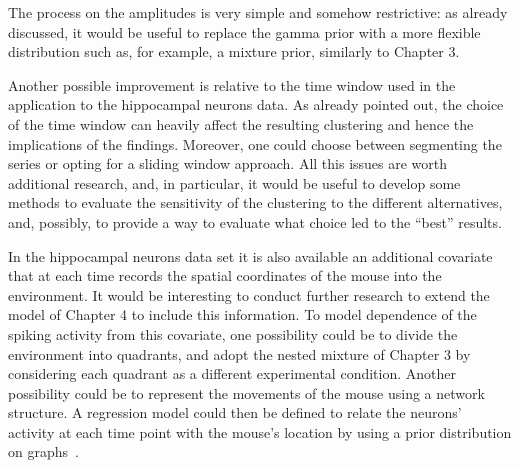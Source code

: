 The process on the amplitudes is very simple and somehow restrictive: as already discussed, it would be useful to replace the gamma prior with a more flexible distribution such as, for example, a mixture prior, similarly to Chapter 3.

Another possible improvement is relative to the time window used in the application to the hippocampal neurons data. As already pointed out, the choice of the time window can heavily affect the resulting clustering and hence the implications of the findings. Moreover, one could choose between segmenting the series or opting for a sliding window approach. All this issues are worth additional research, and, in particular, it would be useful to develop some methods to evaluate the sensitivity of the clustering to the different alternatives, and, possibly, to provide a way to evaluate what choice led to the ``best'' results.

In the hippocampal neurons data set it is also available an additional covariate that at each time records the spatial coordinates of the mouse into the environment. It would be interesting to conduct further research to extend the model of Chapter 4 to include this information. To model dependence of the spiking activity from this covariate, one possibility could be to divide the environment into quadrants, and adopt the nested mixture of Chapter 3 by considering each quadrant as a different experimental condition.
Another possibility could be to represent the movements of the mouse using a network structure. A regression model could then be defined to relate the neurons' activity at each time point with the mouse's location by using a prior distribution on graphs~\parencite{cai2019}. 



